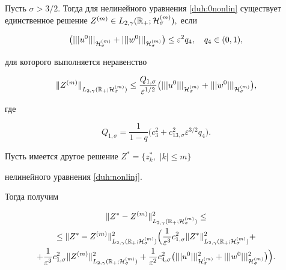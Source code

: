 \begin{theorem}[7]\label{duh:exisz}Пусть $\sigma>3/2.$ Тогда для нелинейного уравнения \eqref{duh:0nonlin} существует единственное решение $Z^{(m)}\in L_{2,\gamma}(\mathbb R_{+};{\cal H}^{(m)}_\sigma),$ если

\begin{equation}

\bigl(|||u^0|||_{{\cal H}^{(m)}_\sigma}+|||w^0|||_{{\cal H}^{(m)}_\sigma}\bigr)\le \varepsilon^2 q_4, \quad  q_4\in(0, 1),

\label{duh:mainest}

\end{equation}

для которого выполняется неравенство

$$

\|Z^{(m)}\|_{L_{2,\gamma}(\mathbb R_{+};{\cal H}^{(m)}_{\sigma})} \le  

\frac{Q_{1,\sigma}}{\varepsilon^{1/2}}\bigl(|||u^0|||_{{\cal H}^{(m)}_\sigma}+|||w^0|||_{{\cal H}^{(m)}_\sigma}\bigr),

$$

где

$$

Q_{1,\sigma}=\frac{1}{1-q}\bigl(c_3^2 +c_{13,\sigma}^2 \varepsilon^{3/2}q_4\bigr).

$$

\end{theorem}



\smallskip







 Пусть имеется другое решение $Z^*=\{z^*_k, $ $ |k|\le m\}$

нелинейного уравнения  \eqref{duh:nonlinj}. 

Тогда получим

\begin{multline}

\|Z^*-Z^{(m)}\|^2_{L_{2,\gamma}(\mathbb R_{+};{\cal H}^{(m)}_\sigma)}\le 

\\

\le

\|Z^*-Z^{(m)}\|^2_{L_{2,\gamma}(\mathbb R_{+};{\cal H}^{(m)}_\sigma)}\Bigl( \frac{1}{\varepsilon^3} c^2_{1,\sigma}\|Z^*\|^2_{L_{2,\gamma}(\mathbb R_{+};{\cal H}^{(m)}_\sigma)}+

\\

+ \frac{1}{\varepsilon^3} c^2_{1,\sigma}\|Z^{(m)}\|^2_{L_{2,\gamma}(\mathbb R_{+};{\cal H}^{(m)}_\sigma)}+\frac{1}{\varepsilon^2} c^2_{4,\sigma}\bigl(|||u^0|||^2_{{\cal H}^{(m)}_\sigma}+|||w^0|||^2_{{\cal H}^{(m)}_\sigma}\bigr)\Bigr).

\label{duh:000}

\end{multline}

